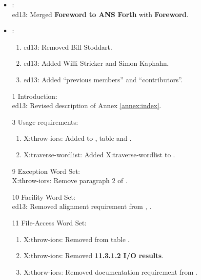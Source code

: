 	\begin{itemize}
	\item {}:							%
		~\\ \textsf{ed13}: Merged \textbf{Foreword to ANS Forth} with \textbf{Foreword}.

	\item {}:							%
		\begin{enumerate}
		\item \textsf{ed13}: Removed Bill Stoddart.
		\item \textsf{ed13}: Added Willi Stricker and Simon Kaphahn.
		\item \textsf{ed13}: Added ``previous members'' and ``contributors''.
		\end{enumerate}

	\item[1] Introduction:							%
		~ \\
		\textsf{ed13}: Revised description of Annex \ref{annex:index}.

	\item[3] Usage requirements:					%
		\begin{enumerate}
		\item \textsf{X:throw-iors}:
			Added  to , table 
			and .
		\item \textsf{X:traverse-wordlist}:
			Added \textsf{X:traverse-wordlist} to .
		\end{enumerate}

	\item[9] Exception Word Set:					%
		~ \\
		\textsf{X:throw-iors}: Remove paragraph 2 of .

	\item[10] Facility Word Set:					%
		~ \\
		\textsf{ed13}: Removed alignment requirement from , .

	\item[11] File-Access Word Set:				%
		\begin{enumerate}
		\item \textsf{X:throw-iors}: Removed  from table .
		\item \textsf{X:throw-iors}: Removed \textbf{11.3.1.2 I/O results}.
		\item \textsf{X:thorw-iors}: Removed  documentation requirement from .
		\end{enumerate}


\end{itemize}
